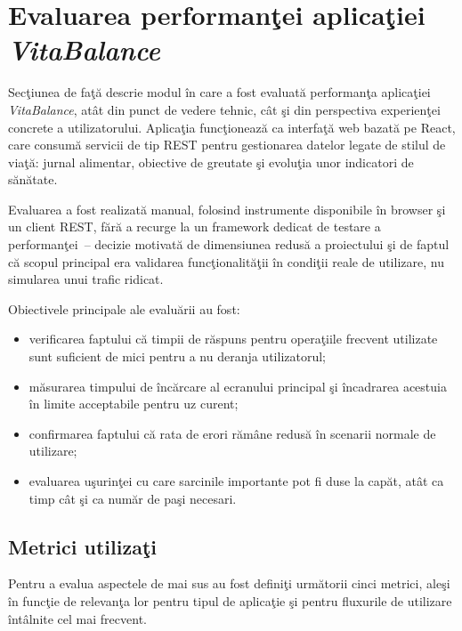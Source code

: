 \documentclass[12pt,a4paper]{article}
\begin{document}
\section*{Evaluarea performan\c{t}ei aplica\c{t}iei \textit{VitaBalance}}

Sec\c{t}iunea de fa\c{t}\u{a} descrie modul \^{i}n care a fost evaluat\u{a} performan\c{t}a aplica\c{t}iei \textit{VitaBalance}, at\^{a}t din punct de vedere tehnic, c\^{a}t \c{s}i din perspectiva experien\c{t}ei concrete a utilizatorului. Aplica\c{t}ia func\c{t}ioneaz\u{a} ca interfa\c{t}\u{a} web bazat\u{a} pe React, care consum\u{a} servicii de tip REST pentru gestionarea datelor legate de stilul de via\c{t}\u{a}: jurnal alimentar, obiective de greutate \c{s}i evolu\c{t}ia unor indicatori de s\u{a}n\u{a}tate.

Evaluarea a fost realizat\u{a} manual, folosind instrumente disponibile \^{i}n browser \c{s}i un client REST, f\u{a}r\u{a} a recurge la un framework dedicat de testare a performan\c{t}ei~-- decizie motivat\u{a} de dimensiunea redus\u{a} a proiectului \c{s}i de faptul c\u{a} scopul principal era validarea func\c{t}ionalit\u{a}\c{t}ii \^{i}n condi\c{t}ii reale de utilizare, nu simularea unui trafic ridicat.

Obiectivele principale ale evalu\u{a}rii au fost:
\begin{itemize}
  \item verificarea faptului c\u{a} timpii de r\u{a}spuns pentru opera\c{t}iile frecvent utilizate sunt suficient de mici pentru a nu deranja utilizatorul;
  \item m\u{a}surarea timpului de \^{i}nc\u{a}rcare al ecranului principal \c{s}i \^{i}ncadrarea acestuia \^{i}n limite acceptabile pentru uz curent;
  \item confirmarea faptului c\u{a} rata de erori r\u{a}m\^{a}ne redus\u{a} \^{i}n scenarii normale de utilizare;
  \item evaluarea u\c{s}urin\c{t}ei cu care sarcinile importante pot fi duse la cap\u{a}t, at\^{a}t ca timp c\^{a}t \c{s}i ca num\u{a}r de pa\c{s}i necesari.
\end{itemize}

\subsection*{Metrici utiliza\c{t}i}

Pentru a evalua aspectele de mai sus au fost defini\c{t}i urm\u{a}torii cinci metrici, ale\c{s}i \^{i}n func\c{t}ie de relevan\c{t}a lor pentru tipul de aplica\c{t}ie \c{s}i pentru fluxurile de utilizare \^{i}nt\^{a}lnite cel mai frecvent.
\end{document}

